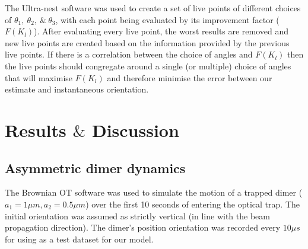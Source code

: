 \documentclass[final, 3p]{elsarticle}
\begin{document}
The Ultra-nest software was used to create a set of live points of different choices of $\theta_1, \ \theta_2, \ \& \ \theta_3$, with each point being evaluated by its improvement factor ($F(K_l)$). After evaluating every live point, the worst results are removed and new live points are created based on the information provided by the previous live points. If there is a correlation between the choice of angles and $F(K_l)$ then the live points should congregate around a single (or multiple) choice of angles that will maximise $F(K_l)$ and therefore minimise the error between our estimate and instantaneous orientation. 

\section{Results $\&$ Discussion}
\label{sec:Discussion}
\subsection{Asymmetric dimer dynamics}
\label{sec:3.1}
The Brownian OT software was used to simulate the motion of a trapped dimer ($a_1=1\mu m, a_2=0.5\mu m$) over the first 10 seconds of entering the optical trap. The initial orientation was assumed as strictly vertical (in line with the beam propagation direction). The dimer's position orientation was recorded every $10 \mu s$ for using as a test dataset for our model. 
\end{document}
